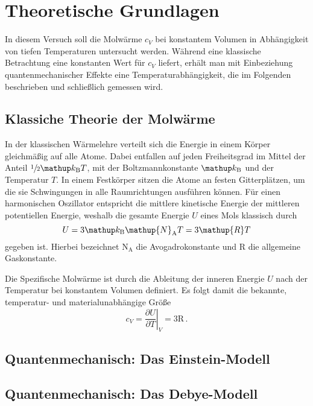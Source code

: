 \section{Theoretische Grundlagen}
\label{sec:theorie}
In diesem Versuch soll die Molwärme $c_V$ bei konstantem Volumen in
Abhängigkeit von tiefen Temperaturen untersucht werden.
Während eine klassische Betrachtung eine konstanten Wert für $c_V$
liefert, erhält man mit Einbeziehung quantenmechanischer Effekte eine
Temperaturabhängigkeit, die im Folgenden beschrieben und schließlich 
gemessen wird.

\subsection{Klassiche Theorie der Molwärme}
\label{subsec:klassisch}
In der klassischen Wärmelehre verteilt sich die Energie in einem Körper
gleichmäßig auf alle Atome. Dabei entfallen auf jeden Freiheitsgrad im Mittel
der Anteil $\sfrac{1}{2}\kb T$, mit der Boltzmannkonstante $\kb$ und der
Temperatur $T$.
In einem Festkörper sitzen die Atome an festen Gitterplätzen, um die sie
Schwingungen in alle Raumrichtungen ausführen können. Für einen harmonischen
Oszillator entspricht die mittlere kinetische Energie der mittleren
potentiellen Energie, weshalb die gesamte Energie $U$ eines Mols klassisch
durch
\begin{equation}
    \label{eqn:innere_energie}
    U = 3 \kb \mathup{N}_\text{A} T = 3\mathup{R}T
\end{equation}
gegeben ist. Hierbei bezeichnet $\mathup{N}_\text{A}$ die Avogadrokonstante
und $\mathup{R}$ die allgemeine Gaskonstante.

Die Spezifische Molwärme ist durch die Ableitung der inneren Energie $U$ nach
der Temperatur bei konstantem Volumen definiert. Es folgt damit
die bekannte, temperatur- und materialunabhängige Größe
\begin{equation}
    \label{eqn:cv_klassisch}
    c_V = \left.\frac{\partial U}{\partial T}\right|_V = 3 \mathup{R}\,.
\end{equation}

\subsection{Quantenmechanisch: Das Einstein-Modell}
\label{subsec:einstein}

\subsection{Quantenmechanisch: Das Debye-Modell}
\label{subsec:debye}
